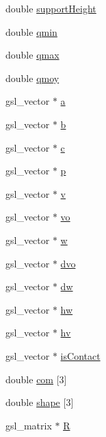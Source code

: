 \begin{DoxyCompactItemize}
double \hyperlink{struct_stu_l_i_n_k_a1c3353d1177251d7c4a501ecf9f1a173}{support\-Height}
\item 
double \hyperlink{struct_stu_l_i_n_k_a5c81b5fed2f26bcd1252bdc55bb8f5ac}{qmin}
\item 
double \hyperlink{struct_stu_l_i_n_k_a71e23e65ee4e5373126cee143f2831fa}{qmax}
\item 
double \hyperlink{struct_stu_l_i_n_k_a123207ffd54d9bd661c546c3a93d073f}{qmoy}
\item 
gsl\-\_\-vector $\ast$ \hyperlink{struct_stu_l_i_n_k_a1e723aadb35dfd08573b83d519898158}{a}
\item 
gsl\-\_\-vector $\ast$ \hyperlink{struct_stu_l_i_n_k_acf1a2ff4b1eba679780b9e131acf36e8}{b}
\item 
gsl\-\_\-vector $\ast$ \hyperlink{struct_stu_l_i_n_k_a108b1b851d2b9f8d8f89a622f0bb90ea}{c}
\item 
gsl\-\_\-vector $\ast$ \hyperlink{struct_stu_l_i_n_k_a1fca5e9ed2cedc33aeffbd49a3a8b129}{p}
\item 
gsl\-\_\-vector $\ast$ \hyperlink{struct_stu_l_i_n_k_a538022e83bb338f4ce53009e28415044}{v}
\item 
gsl\-\_\-vector $\ast$ \hyperlink{struct_stu_l_i_n_k_a9af386e4e1dfa53e76c54ddc8e658c62}{vo}
\item 
gsl\-\_\-vector $\ast$ \hyperlink{struct_stu_l_i_n_k_a03f025ccf39e422abad70f0dcc51ea08}{w}
\item 
gsl\-\_\-vector $\ast$ \hyperlink{struct_stu_l_i_n_k_a8656076f5f82f1d007f76e569b4d610b}{dvo}
\item 
gsl\-\_\-vector $\ast$ \hyperlink{struct_stu_l_i_n_k_a007064d4045df2e08a468f625f48134e}{dw}
\item 
gsl\-\_\-vector $\ast$ \hyperlink{struct_stu_l_i_n_k_ad5b22cc091d474f9a72b98483e532d8a}{hw}
\item 
gsl\-\_\-vector $\ast$ \hyperlink{struct_stu_l_i_n_k_a047b5818b1f61a1ae7cf4b367fb2a351}{hv}
\item 
gsl\-\_\-vector $\ast$ \hyperlink{struct_stu_l_i_n_k_acd521dd28fd76f6c1a1de75c85904ba4}{is\-Contact}
\item 
double \hyperlink{struct_stu_l_i_n_k_a9659866c7533736433d4391b17f5501b}{com} \mbox{[}3\mbox{]}
\item 
double \hyperlink{struct_stu_l_i_n_k_addeb68e8573156d309bcecac3bdd7232}{shape} \mbox{[}3\mbox{]}
\item 
gsl\-\_\-matrix $\ast$ \hyperlink{struct_stu_l_i_n_k_aa668961bd0b6248c88c0ee075be18b36}{R}
\item 

\end{DoxyCompactItemize}
